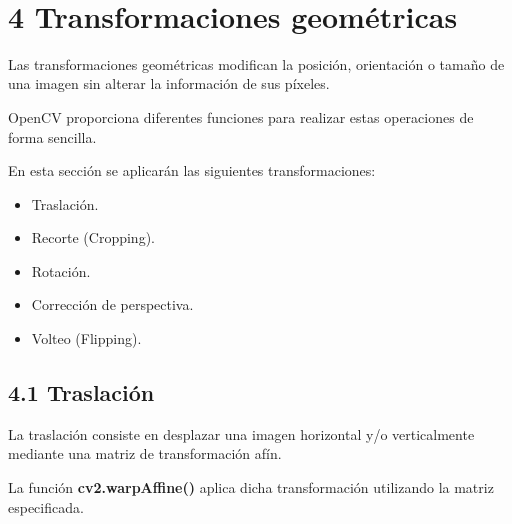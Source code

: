 \documentclass[11pt]{article}
\providecommand{\tightlist}{%
      \setlength{\itemsep}{0pt}\setlength{\parskip}{0pt}}
\begin{document}
    \begin{center}
    \end{center}
    { \hspace*{\fill} \\}
    
    \section{4 Transformaciones
geométricas}\label{transformaciones-geomuxe9tricas}

Las transformaciones geométricas modifican la posición, orientación o
tamaño de una imagen sin alterar la información de sus píxeles.

OpenCV proporciona diferentes funciones para realizar estas operaciones
de forma sencilla.

En esta sección se aplicarán las siguientes transformaciones:

\begin{itemize}
\tightlist
\item
  Traslación.
\item
  Recorte (Cropping).
\item
  Rotación.
\item
  Corrección de perspectiva.
\item
  Volteo (Flipping).
\end{itemize}

    \subsection{4.1 Traslación}\label{traslaciuxf3n}

La traslación consiste en desplazar una imagen horizontal y/o
verticalmente mediante una matriz de transformación afín.

La función \textbf{cv2.warpAffine()} aplica dicha transformación
utilizando la matriz especificada.
\end{document}
